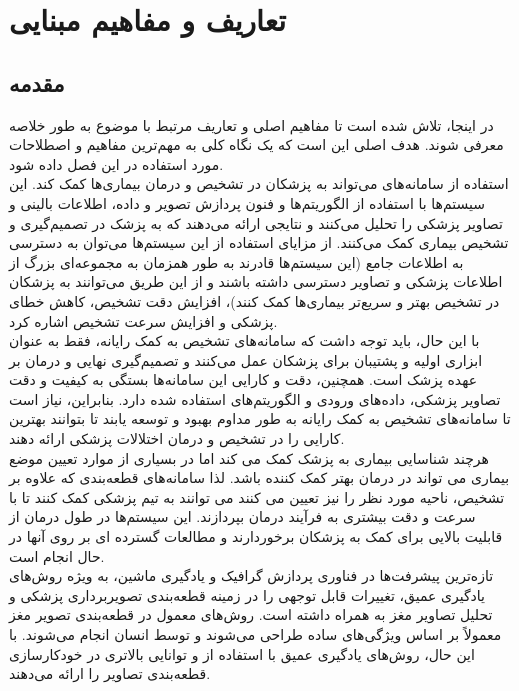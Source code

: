 \chapter{تعاریف و مفاهیم مبنایی }
\thispagestyle{empty}
\section{مقدمه}
در اینجا، تلاش شده است تا مفاهیم اصلی و تعاریف مرتبط با موضوع به طور خلاصه معرفی شوند. هدف اصلی این است که یک نگاه کلی به مهم‌ترین مفاهیم و اصطلاحات مورد استفاده در این فصل داده شود.
\\
استفاده از سامانه‌های  می‌تواند به پزشکان در تشخیص و درمان بیماری‌ها کمک کند. این سیستم‌ها با استفاده از الگوریتم‌ها و فنون پردازش تصویر و داده، اطلاعات بالینی و تصاویر پزشکی را تحلیل می‌کنند و نتایجی ارائه می‌دهند که به پزشک در تصمیم‌گیری و تشخیص بیماری کمک می‌کنند. از مزایای استفاده از این سیستم‌ها می‌توان به دسترسی به اطلاعات جامع (این سیستم‌ها قادرند به طور همزمان به مجموعه‌ای بزرگ از اطلاعات پزشکی و تصاویر دسترسی داشته باشند و از این طریق می‌توانند به پزشکان در تشخیص بهتر و سریع‌تر بیماری‌ها کمک کنند)، افزایش دقت تشخیص، کاهش خطای پزشکی و افزایش سرعت تشخیص اشاره کرد.
\\
با این حال، باید توجه داشت که سامانه‌های تشخیص به کمک رایانه، فقط به عنوان ابزاری اولیه و پشتیبان برای پزشکان عمل می‌کنند و تصمیم‌گیری نهایی و درمان بر عهده پزشک است. همچنین، دقت و کارایی این سامانه‌ها بستگی به کیفیت و دقت تصاویر پزشکی، داده‌های ورودی و الگوریتم‌های استفاده شده دارد. بنابراین، نیاز است تا سامانه‌های تشخیص به کمک رایانه به طور مداوم بهبود و توسعه یابند تا بتوانند بهترین کارایی را در تشخیص و درمان اختلالات پزشکی ارائه دهند\cite{pandey2022comprehensive}.
\\
هرچند شناسایی بیماری به پزشک کمک می کند اما در بسیاری از موارد تعیین موضع بیماری می تواند در درمان بهتر کمک کننده باشد. لذا ‌سامانه‌های قطعه‌بندی که علاوه بر تشخیص، ناحیه مورد نظر را نیز تعیین می کنند می توانند به تیم پزشکی کمک کنند تا با سرعت و دقت بیشتری به فرآیند درمان بپردازند. این سیستم‌ها در طول درمان از قابلیت بالایی برای کمک به پزشکان برخوردارند و مطالعات گسترده ای بر روی آنها در حال انجام است.
\\
تازه‌ترین پیشرفت‌ها در فناوری پردازش گرافیک و یادگیری ماشین، به ویژه روش‌های یادگیری عمیق، تغییرات قابل توجهی را در زمینه قطعه‌بندی تصویربرداری پزشکی و تحلیل تصاویر مغز به همراه داشته است. روش‌های معمول در قطعه‌بندی تصویر مغز معمولاً بر اساس ویژگی‌های ساده طراحی می‌شوند و توسط انسان انجام می‌شوند. با این حال، روش‌های یادگیری عمیق با استفاده از  و  توانایی بالاتری در خودکارسازی قطعه‌بندی تصاویر را ارائه می‌دهند.
